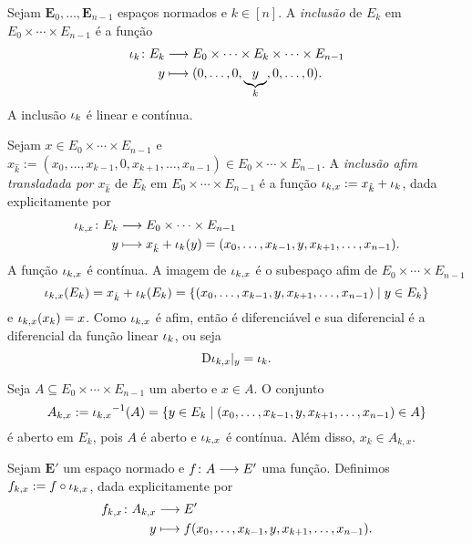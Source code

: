 Sejam $\bm E_0, \ldots, \bm E_{n-1}$ espaços normados e $k \in [n]$. A \emph{inclusão} de $E_k$ em $E_0 \times \cdots \times E_{n-1}$ é a função
	\begin{align*}
	{\iota_k}\colon {E_k} &\longrightarrow {E_0 \times \cdots \times E_k \times \cdots \times E_{n-1}} \\{y} &\longmapsto (0,\ldots,0,\underbrace{y}_k,0,\ldots,0).
	\end{align*}
A inclusão $\iota_k$ é linear e contínua.

Sejam $x \in E_0 \times \cdots \times E_{n-1}$ e $x_{\hat{k}} := (x_0,\ldots,x_{k-1},0,x_{k+1},\ldots,x_{n-1}) \in E_0 \times \cdots \times E_{n-1}$. A \emph{inclusão afim transladada por $x_{\hat{k}}$} de $E_k$ em $E_0 \times \cdots \times E_{n-1}$ é a função $\iota_{k,x} := x_{\hat{k}} + \iota_k$, dada explicitamente por
	\begin{align*}
	{\iota_{k,x}}\colon {E_k} &\longrightarrow {E_0 \times \cdots \times E_{n-1}} \\{y} &\longmapsto x_{\hat{k}}+\iota_k(y) = (x_0,\ldots,x_{k-1},y,x_{k+1},\ldots,x_{n-1}).
	\end{align*}
A função $\iota_{k,x}$ é contínua. A imagem de $\iota_{k,x}$ é o subespaço afim de $E_0 \times \cdots \times E_{n-1}$
	\begin{equation*}
	\iota_{k,x}(E_k) = x_{\hat{k}} + \iota_k(E_k) = \left\{ (x_0,\ldots,x_{k-1},y,x_{k+1},\ldots,x_{n-1}) \;\middle\vert\; y \in E_k \right\}
	\end{equation*}
e $\iota_{k,x}(x_k) = x$. Como $\iota_{k,x}$ é afim, então é diferenciável e sua diferencial é a diferencial da função linear $\iota_k$, ou seja
	\begin{equation*}
	\mathrm{D} \iota_{k,x}|_y = \iota_k.
	\end{equation*}

Seja $A \subseteq E_0 \times \cdots \times E_{n-1}$ um aberto e $x \in A$. O conjunto
	\begin{equation*}
	A_{k,x} := {\iota_{k,x}}^{-1}(A) = \left\{ y \in E_k \;\middle\vert\; (x_0,\ldots,x_{k-1},y,x_{k+1},\ldots,x_{n-1}) \in A \right\}
	\end{equation*}
é aberto em $E_k$, pois $A$ é aberto e $\iota_{k,x}$ é contínua. Além disso, $x_k \in A_{k,x}$.

Sejam $\bm E'$ um espaço normado e $f\colon \allowbreak A \longrightarrow E'$ uma função. Definimos $f_{k,x} := f \circ \iota_{k,x}$, dada explicitamente por
	\begin{align*}
	{f_{k,x}}\colon {A_{k,x}} &\longrightarrow {E'} \\{y} &\longmapsto f(x_0,\ldots,x_{k-1},y,x_{k+1},\ldots,x_{n-1}).
	\end{align*}

